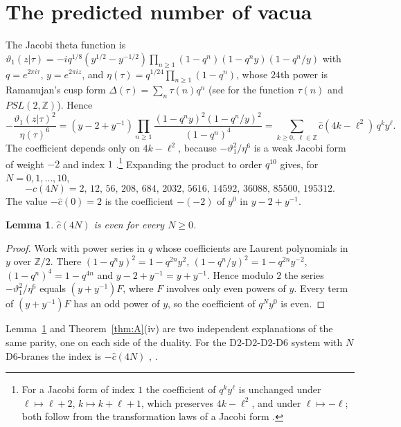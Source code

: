 \documentclass[11pt]{amsart}
\newtheorem{lemma}[theorem]{Lemma}
\theoremstyle{definition}
\newcommand{\ZZ}{\mathbb{Z}}
\begin{document}
\section{The predicted number of vacua}\label{app:prediction}
The Jacobi theta function is $\vartheta_1(z|\tau)=-iq^{1/8}(y^{1/2}-y^{-1/2})\prod_{n\ge1}(1-q^n)(1-q^ny)(1-q^n/y)$ with $q=e^{2\pi i\tau}$, $y=e^{2\pi iz}$, and $\eta(\tau)=q^{1/24}\prod_{n\ge1}(1-q^n)$, whose $24$th power is Ramanujan's cusp form $\Delta(\tau)=\sum_n\tau(n)q^n$ (see \cite{BBS23} for the function $\tau(n)$ and $PSL(2,\ZZ)$). Hence
\[
-\frac{\vartheta_1(z|\tau)^2}{\eta(\tau)^6}=(y-2+y^{-1})\prod_{n\ge1}\frac{(1-q^ny)^2(1-q^n/y)^2}{(1-q^n)^4}=\sum_{k\ge0,\ \ell\in\ZZ}\hat c(4k-\ell^2)\,q^ky^\ell .
\]
The coefficient depends only on $4k-\ell^2$, because $-\vartheta_1^2/\eta^6$ is a weak Jacobi form of weight $-2$ and index $1$ \cite{EZ85,SSY06}.\footnote{For a Jacobi form of index $1$ the coefficient of $q^ky^\ell$ is unchanged under $\ell\mapsto\ell+2$, $k\mapsto k+\ell+1$, which preserves $4k-\ell^2$, and under $\ell\mapsto-\ell$; both follow from the transformation laws of a Jacobi form \cite[Chapter~I]{EZ85}.} Expanding the product to order $q^{10}$ gives, for $N=0,1,\dots,10$,
\[
-\hat c(4N)=2,\,12,\,56,\,208,\,684,\,2032,\,5616,\,14592,\,36088,\,85500,\,195312 .
\]
The value $-\hat c(0)=2$ is the coefficient $-(-2)$ of $y^0$ in $y-2+y^{-1}$.

\begin{lemma}\label{lem:parity}
$\hat c(4N)$ is even for every $N\ge0$.
\end{lemma}

\begin{proof}
Work with power series in $q$ whose coefficients are Laurent polynomials in $y$ over $\ZZ/2$. There $(1-q^ny)^2=1-q^{2n}y^2$, $(1-q^n/y)^2=1-q^{2n}y^{-2}$, $(1-q^n)^4=1-q^{4n}$ and $y-2+y^{-1}=y+y^{-1}$. Hence modulo $2$ the series $-\vartheta_1^2/\eta^6$ equals $(y+y^{-1})F$, where $F$ involves only even powers of $y$. Every term of $(y+y^{-1})F$ has an odd power of $y$, so the coefficient of $q^Ny^0$ is even.
\end{proof}

Lemma~\ref{lem:parity} and Theorem~\ref{thm:A}(iv) are two independent explanations of the same parity, one on each side of the duality. For the D2-D2-D2-D6 system with $N$ D6-branes the index is $-\hat c(4N)$ \cite[Section~2]{CGMS16}, \cite{SSY06}.
\end{document}
